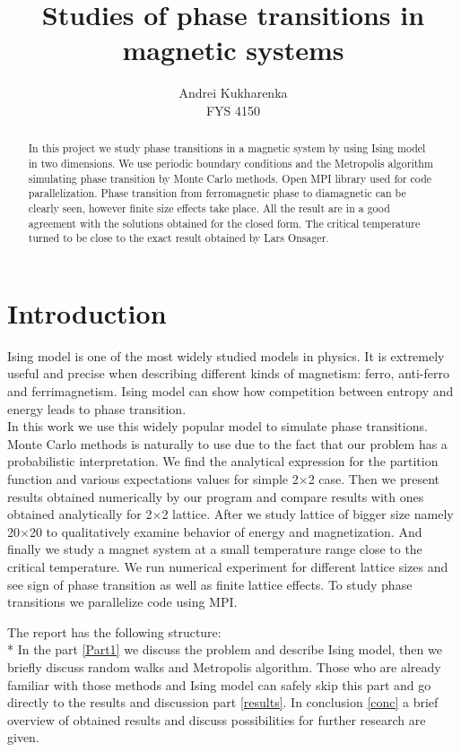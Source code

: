 \documentclass[10pt]{article}
\begin{document}
\setlength\parindent{1pt}
\title{Studies of phase transitions in magnetic systems}
\author{Andrei Kukharenka \\  
FYS 4150 
}

\maketitle
\begin{abstract}
In this project we study phase transitions in a magnetic system by using Ising model in two dimensions.
We use periodic boundary conditions and the Metropolis algorithm simulating phase transition by Monte Carlo methods.
Open MPI library used for code parallelization. Phase transition from ferromagnetic phase to diamagnetic can be clearly seen, however
finite size effects take place.
All the result are in a good agreement with the solutions obtained for the closed form. The critical temperature turned to be close to the exact result obtained by Lars Onsager\cite{Onsager}. ​


\end{abstract}
\clearpage 


\section{Introduction}
Ising model is one of the most widely studied models in physics. It is extremely useful and precise when describing different kinds of magnetism: ferro, anti-ferro and ferrimagnetism. Ising model can show how competition between entropy and energy leads to phase transition. \\
In this work we use this widely popular model to simulate phase transitions. Monte Carlo methods is naturally to use due to the fact that our problem has a probabilistic interpretation.
We find the analytical expression for the partition function and various expectations values for simple 2$\times$2 case.
Then we present results obtained numerically by our program and compare results with ones obtained analytically for 2$\times$2 lattice.
After we study lattice of bigger size namely 20$\times$20 to qualitatively examine behavior of energy and magnetization. And finally we study a magnet system at a small temperature range close to the critical temperature. We run numerical experiment for different lattice sizes and see sign of phase transition as well as finite lattice effects. To study phase transitions we parallelize code using MPI.

The report has the following structure:\\*
In the part \ref{Part1}  we discuss the problem and describe Ising model, then we briefly discuss random walks and Metropolis algorithm. Those who are already familiar with those methods and Ising model can safely skip this part and go directly to the results and discussion part \ref{results}. In conclusion \ref{conc} a brief overview of obtained results and discuss possibilities for further research are given. 
\end{document}
